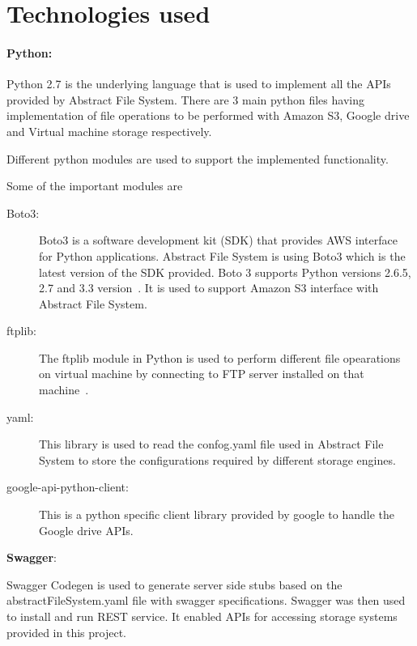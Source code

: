 \section{Technologies used}


\paragraph{Python:}


Python 2.7 is the underlying language that is used to implement all the APIs 
provided by Abstract File System.  There are 3 main python files having 
implementation of file operations to be performed with Amazon S3, Google drive 
and Virtual machine storage respectively. 


Different python modules are used to support the implemented functionality.

Some of the important modules are 

\begin{description}
\item[Boto3:] Boto3 is a software development kit (SDK) that provides AWS interface for 
Python applications. Abstract File System is using Boto3 which is the latest 
version of the SDK provided. Boto 3 supports Python versions 2.6.5, 2.7 and 
3.3 version~\cite{hid-sp18-420-boto}. 
It is used to support Amazon S3 interface with Abstract File System.

\item[ftplib:] The ftplib module in Python is used to perform different file opearations on 
virtual machine by connecting to FTP server installed on that 
machine~\cite{hid-sp18-420-FTP}.

\item[yaml:] This library is used to read the confog.yaml file used in Abstract File System 
to store the configurations required by different storage engines.


\item[google-api-python-client:]

This is a python specific client library provided by google to handle the 
Google drive APIs.

\end{description}


\textbf{Swagger}:

Swagger Codegen is used to generate server side stubs based on the 
abstractFileSystem.yaml file with swagger specifications. 
Swagger was then used to install and run REST service. It enabled 
APIs for accessing storage systems provided in this project.



